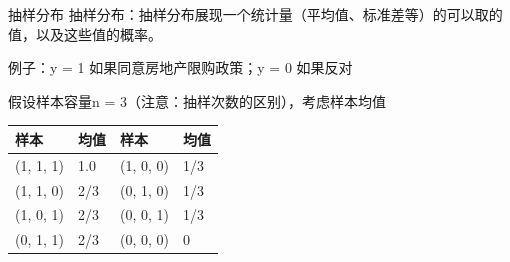 \documentclass[presentation]{beamer}
\begin{document}
\begin{frame}[label={sec:orgd79251a}]{抽样分布}
抽样分布：抽样分布展现一个统计量（平均值、标准差等）的可以取的值，以及这些值的概率。

例子：y = 1 如果同意房地产限购政策；y = 0 如果反对

假设样本容量n = 3（注意：抽样次数的区别），考虑样本均值  

\begin{center}
\begin{tabular}{llll}
样本 & 均值 & 样本 & 均值\\
\hline
(1, 1, 1) & 1.0 & (1, 0, 0) & 1/3\\
(1, 1, 0) & 2/3 & (0, 1, 0) & 1/3\\
(1, 0, 1) & 2/3 & (0, 0, 1) & 1/3\\
(0, 1, 1) & 2/3 & (0, 0, 0) & 0\\
\end{tabular}
\end{center}
\end{frame}
\end{document}
